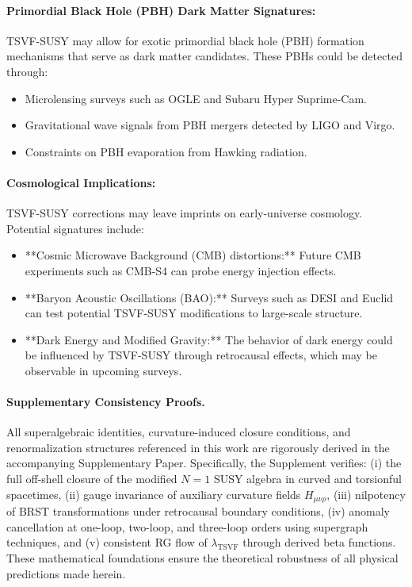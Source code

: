 \documentclass[twocolumn,superscriptaddress,floatfix]{revtex4-2}
\begin{document}
\paragraph{Primordial Black Hole (PBH) Dark Matter Signatures:}  
TSVF-SUSY may allow for exotic primordial black hole (PBH) formation mechanisms that serve as dark matter candidates. These PBHs could be detected through:
\begin{itemize}
    \item Microlensing surveys such as OGLE and Subaru Hyper Suprime-Cam.
    \item Gravitational wave signals from PBH mergers detected by LIGO and Virgo.
    \item Constraints on PBH evaporation from Hawking radiation.

\end{itemize}

\paragraph{Cosmological Implications:}  
TSVF-SUSY corrections may leave imprints on early-universe cosmology. Potential signatures include:
\begin{itemize}
    \item **Cosmic Microwave Background (CMB) distortions:** Future CMB experiments such as CMB-S4 can probe energy injection effects.
    \item **Baryon Acoustic Oscillations (BAO):** Surveys such as DESI and Euclid can test potential TSVF-SUSY modifications to large-scale structure.
    \item **Dark Energy and Modified Gravity:** The behavior of dark energy could be influenced by TSVF-SUSY through retrocausal effects, which may be observable in upcoming surveys.
\end{itemize}

\paragraph*{Supplementary Consistency Proofs.}
All superalgebraic identities, curvature-induced closure conditions, and renormalization structures referenced in this work are rigorously derived in the accompanying Supplementary Paper. Specifically, the Supplement verifies:
(i) the full off-shell closure of the modified $N = 1$ SUSY algebra in curved and torsionful spacetimes,
(ii) gauge invariance of auxiliary curvature fields $H_{\mu\nu\rho}$,
(iii) nilpotency of BRST transformations under retrocausal boundary conditions,
(iv) anomaly cancellation at one-loop, two-loop, and three-loop orders using supergraph techniques,
and (v) consistent RG flow of $\lambda_{\text{TSVF}}$ through derived beta functions.
These mathematical foundations ensure the theoretical robustness of all physical predictions made herein.
\end{document}
